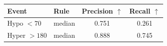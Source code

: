 \begin{tabular}{llcc}
\toprule
Event & Rule & Precision $\uparrow$ & Recall $\uparrow$ \\
\midrule
Hypo $<70$ & median & 0.751 & 0.261 \\
Hyper $>180$ & median & 0.888 & 0.745 \\
\bottomrule
\end{tabular}

